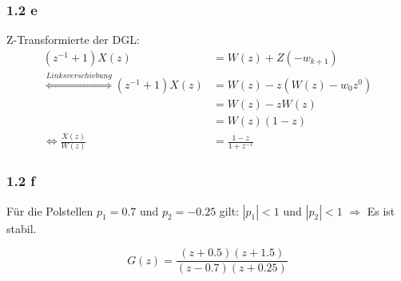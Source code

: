 \documentclass[a4paper]{scrartcl}
\begin{document}
  \subsubsection*{1.2 e}
  Z-Transformierte der DGL:
  \begin{align}
      (z^{-1} + 1) X(z) &= W(z) + Z(-w_{k+1})\\
      \overset{Linksverschiebung}{\Leftrightarrow} (z^{-1} + 1) X(z) &= W(z) - z(W(z) - w_0 z^0)\\
      &= W(z)- z W(z)\\
      &= W(z) (1-z)\\
      \Leftrightarrow \frac{X(z)}{W(z)} &= \frac{1-z}{1+z^{-1}}
  \end{align}

  \subsubsection*{1.2 f}
  Für die Polstellen $p_1 = 0.7$ und $p_2 = -0.25$ gilt: $|p_1| < 1$ und $|p_2| < 1$
  $\Rightarrow$ Es ist stabil.

  \[G(z) = \frac{(z+0.5)(z+1.5)}{(z-0.7) (z+0.25)}\]
\end{document}
